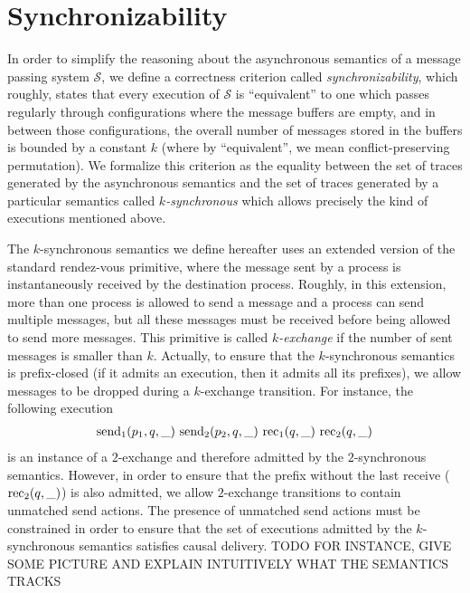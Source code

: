 \section{Synchronizability}\label{sec:criterion}

In order to simplify the reasoning about the asynchronous semantics of a message passing system $\mathcal{S}$, we define a correctness criterion called \emph{synchronizability}, which roughly, states that every execution of $\mathcal{S}$ is ``equivalent'' to one which passes regularly through configurations where the message buffers are empty, and in between those configurations, the overall number of messages stored in the buffers is bounded by a constant $k$ (where by ``equivalent'', we mean conflict-preserving permutation). We formalize this criterion as the equality between the set of traces generated by the asynchronous semantics and the set of traces generated by a particular semantics called \emph{$k$-synchronous} which allows precisely the kind of executions mentioned above.

The $k$-synchronous semantics we define hereafter uses an extended version of the standard rendez-vous primitive, where the message sent by a process is instantaneously received by the destination process. Roughly, in this extension, more than one process is allowed to send a message and a process can send multiple messages, but all these messages must be received before being allowed to send more messages. This primitive is called \emph{$k$-exchange} if the number of sent messages is smaller than $k$. Actually, to ensure that the $k$-synchronous semantics is prefix-closed (if it admits an execution, then it admits all its prefixes), we allow messages to be dropped during a $k$-exchange transition. For instance, the following execution 
\begin{align*}
\send{1}{p_1,q,\_}\ 
\send{2}{p_2,q,\_}\ 
\rec{1}{q,\_}\ 
\rec{2}{q,\_} 
\end{align*}
is an instance of a $2$-exchange and therefore admitted by the $2$-synchronous semantics. However, in order to ensure that the prefix without the last receive ($\mathrm{rec}_{2}({q,\_})$) is also admitted, we allow $2$-exchange transitions to contain unmatched send actions. The presence of unmatched send actions must be constrained in order to ensure that the set of executions admitted by the $k$-synchronous semantics satisfies causal delivery. TODO FOR INSTANCE, GIVE SOME PICTURE AND EXPLAIN INTUITIVELY WHAT THE SEMANTICS TRACKS

